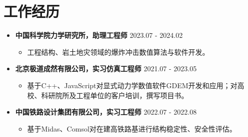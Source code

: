 \documentclass[a4paper,12pt]{extarticle}
\begin{document}
\section*{工作经历}
\begin{itemize}
 \item\textbf{中国科学院力学研究所，助理工程师} \hfill2023.07 - 2024.02%
         \begin{itemize}
            \item 工程结构、岩土地灾领域的爆炸冲击数值算法与软件开发。 \hfill %
\end{itemize}
\end{itemize}

\begin{itemize}
 \item\textbf{北京极道成然有限公司，实习仿真工程师} \hfill2021.07 - 2023.05%
         \begin{itemize}
            \item 基于C++、JavaScript对显式动力学数值软件GDEM开发和应用；对高校、科研院所及工程单位的客户培训，撰写项目书。 \hfill %
\end{itemize}
\end{itemize}

\begin{itemize}
 \item\textbf{中国铁路设计集团有限公司，实习工程师} \hfill 2022.07 - 2022.08%
         \begin{itemize}
            \item 基于Midas、Comsol对在建高铁路基进行结构稳定性、安全性评估。  %
\end{itemize}
\end{itemize}
\end{document}
